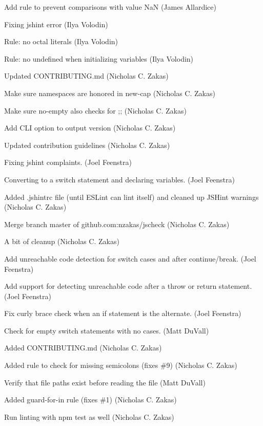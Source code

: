 \begin{DoxyItemize}
\item Add rule to prevent comparisons with value NaN (James Allardice)
\item Fixing jshint error (Ilya Volodin)
\item Rule\+: no octal literals (Ilya Volodin)
\item Rule\+: no undefined when initializing variables (Ilya Volodin)
\item Updated C\+O\+N\+T\+R\+I\+B\+U\+T\+I\+N\+G.\+md (Nicholas C. Zakas)
\item Make sure namespaces are honored in new-\/cap (Nicholas C. Zakas)
\item Make sure no-\/empty also checks for \textquotesingle{};;\textquotesingle{} (Nicholas C. Zakas)
\item Add C\+LI option to output version (Nicholas C. Zakas)
\item Updated contribution guidelines (Nicholas C. Zakas)
\item Fixing jshint complaints. (Joel Feenstra)
\item Converting to a switch statement and declaring variables. (Joel Feenstra)
\item Added .jshintrc file (until E\+S\+Lint can lint itself) and cleaned up J\+S\+Hint warnings (Nicholas C. Zakas)
\item Merge branch \textquotesingle{}master\textquotesingle{} of github.\+com\+:nzakas/jscheck (Nicholas C. Zakas)
\item A bit of cleanup (Nicholas C. Zakas)
\item Add unreachable code detection for switch cases and after continue/break. (Joel Feenstra)
\item Add support for detecting unreachable code after a throw or return statement. (Joel Feenstra)
\item Fix curly brace check when an if statement is the alternate. (Joel Feenstra)
\item Check for empty switch statements with no cases. (Matt Du\+Vall)
\item Added C\+O\+N\+T\+R\+I\+B\+U\+T\+I\+N\+G.\+md (Nicholas C. Zakas)
\item Added rule to check for missing semicolons (fixes \#9) (Nicholas C. Zakas)
\item Verify that file paths exist before reading the file (Matt Du\+Vall)
\item Added guard-\/for-\/in rule (fixes \#1) (Nicholas C. Zakas)
\item Run linting with npm test as well (Nicholas C. Zakas)

\end{DoxyItemize}
